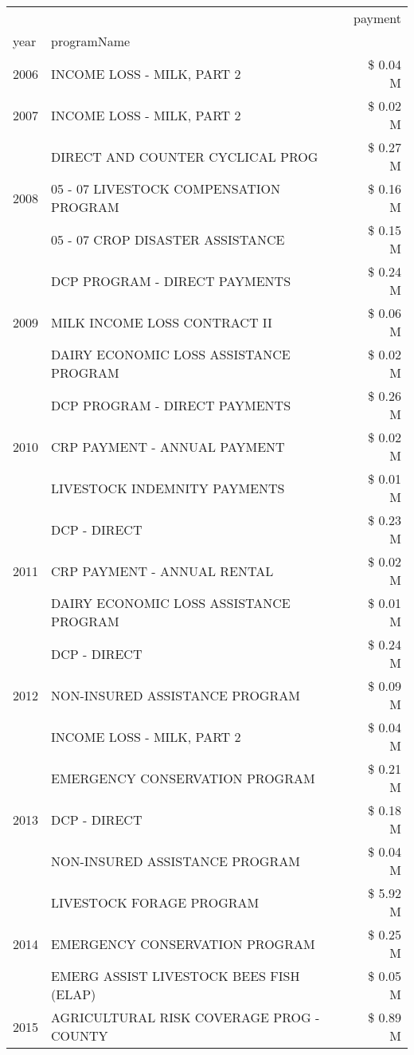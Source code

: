 \begin{tabular}{llr}
\toprule
 &  & payment \\
year & programName &  \\
\midrule
2006 & INCOME LOSS - MILK, PART 2 & \$ 0.04 M \\
\cline{1-3}
2007 & INCOME LOSS - MILK, PART 2 & \$ 0.02 M \\
\cline{1-3}
\multirow[t]{3}{*}{2008} & DIRECT AND COUNTER CYCLICAL PROG & \$ 0.27 M \\
 & 05 - 07 LIVESTOCK COMPENSATION PROGRAM & \$ 0.16 M \\
 & 05 - 07 CROP DISASTER ASSISTANCE & \$ 0.15 M \\
\cline{1-3}
\multirow[t]{3}{*}{2009} & DCP PROGRAM - DIRECT PAYMENTS & \$ 0.24 M \\
 & MILK INCOME LOSS CONTRACT II & \$ 0.06 M \\
 & DAIRY ECONOMIC LOSS ASSISTANCE PROGRAM & \$ 0.02 M \\
\cline{1-3}
\multirow[t]{3}{*}{2010} & DCP PROGRAM - DIRECT PAYMENTS & \$ 0.26 M \\
 & CRP PAYMENT - ANNUAL PAYMENT & \$ 0.02 M \\
 & LIVESTOCK INDEMNITY PAYMENTS & \$ 0.01 M \\
\cline{1-3}
\multirow[t]{3}{*}{2011} & DCP - DIRECT & \$ 0.23 M \\
 & CRP PAYMENT - ANNUAL RENTAL & \$ 0.02 M \\
 & DAIRY ECONOMIC LOSS ASSISTANCE PROGRAM & \$ 0.01 M \\
\cline{1-3}
\multirow[t]{3}{*}{2012} & DCP - DIRECT & \$ 0.24 M \\
 & NON-INSURED ASSISTANCE PROGRAM & \$ 0.09 M \\
 & INCOME LOSS - MILK, PART 2 & \$ 0.04 M \\
\cline{1-3}
\multirow[t]{3}{*}{2013} & EMERGENCY CONSERVATION PROGRAM & \$ 0.21 M \\
 & DCP - DIRECT & \$ 0.18 M \\
 & NON-INSURED ASSISTANCE PROGRAM & \$ 0.04 M \\
\cline{1-3}
\multirow[t]{3}{*}{2014} & LIVESTOCK FORAGE PROGRAM & \$ 5.92 M \\
 & EMERGENCY CONSERVATION PROGRAM & \$ 0.25 M \\
 & EMERG ASSIST LIVESTOCK BEES FISH (ELAP) & \$ 0.05 M \\
\cline{1-3}
\multirow[t]{3}{*}{2015} & AGRICULTURAL RISK COVERAGE PROG - COUNTY & \$ 0.89 M \\

\end{tabular}
